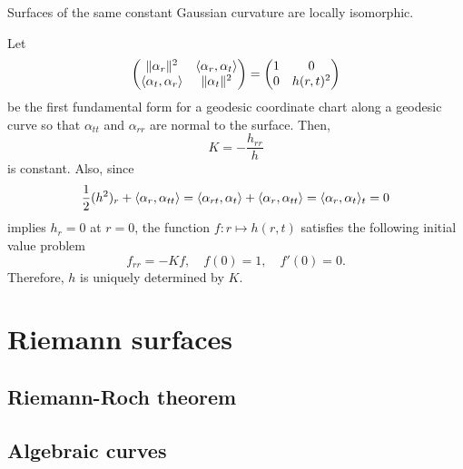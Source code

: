 \documentclass{../../large}
\begin{document}
\begin{prb}
Surfaces of the same constant Gaussian curvature are locally isomorphic.
\end{prb}
\begin{pf}
Let
\[\begin{pmatrix}\|\alpha_r\|^2&\langle\alpha_r,\alpha_t\rangle\\\langle\alpha_t,\alpha_r\rangle&\|\alpha_t\|^2\end{pmatrix}=\begin{pmatrix}1&0\\0&h(r,t)^2\end{pmatrix}\]
be the first fundamental form for a geodesic coordinate chart along a geodesic curve so that $\alpha_{tt}$ and $\alpha_{rr}$ are normal to the surface.
Then,
\[K=-\frac{h_{rr}}h\]
is constant.
Also, since
\[\frac12(h^2)_r+\langle\alpha_r,\alpha_{tt}\rangle=\langle\alpha_{rt},\alpha_t\rangle+\langle\alpha_r,\alpha_{tt}\rangle=\langle\alpha_r,\alpha_t\rangle_t=0\]
implies $h_r=0$ at $r=0$, the function $f:r\mapsto h(r,t)$ satisfies the following initial value problem
\[f_{rr}=-Kf,\quad f(0)=1,\quad f'(0)=0.\]
Therefore, $h$ is uniquely determined by $K$.
\end{pf}



\chapter{}


















\part{Riemann surfaces}
\chapter{}

\chapter{Riemann-Roch theorem}
\chapter{Algebraic curves}
\end{document}
